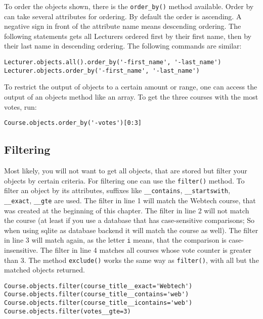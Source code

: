 To order the objects shown, there is the \lstinline|order_by()| method available. Order by can take several attributes for ordering. By default the order is ascending. A negative sign in front of the attribute name means descending ordering. The following statements gets all Lecturers ordered first by their first name, then by their last name in descending ordering. The following commands are similar:
\begin{lstlisting}[style=Python, caption=Retrieving objects in order, label=lst:retrieving_objects_ordered]
Lecturer.objects.all().order_by('-first_name', '-last_name')
Lecturer.objects.order_by('-first_name', '-last_name')
\end{lstlisting}

To restrict the output of objects to a certain amount or range, one can access the output of an objects method like an array. To get the three courses with the most votes, run:
\begin{lstlisting}[style=Python, caption=Retrieving ranges of objects, label=lst:retrieving_objects_range]
Course.objects.order_by('-votes')[0:3]
\end{lstlisting}


\subsection{Filtering}

Most likely, you will not want to get all objects, that are stored but filter your objects by certain criteria. For filtering one can use the \lstinline|filter()| method. To filter an object by its attributes, suffixes like \lstinline|__contains|, \lstinline|__startswith|, \lstinline|__exact|, \lstinline|__gte| are used. The filter in line 1 will match the Webtech course, that was created at the beginning of this chapter. The filter in line 2 will not match the course (at least if you use a database that has case-sensitive comparisons; So when using sqlite as database backend it will match the course as well). The filter in line 3 will match again, as the letter \lstinline|i| means, that the comparison is case-insensitive. The filter in line 4 matches all courses whose vote counter is greater than 3. The method \lstinline|exclude()| works the same way as \lstinline|filter()|, with all but the matched objects returned.
\begin{lstlisting}[style=Python, caption=Filtering objects, label=lst:filtering_objects]
Course.objects.filter(course_title__exact='Webtech')
Course.objects.filter(course_title__contains='web')
Course.objects.filter(course_title__icontains='web')
Course.objects.filter(votes__gte=3)
\end{lstlisting}

